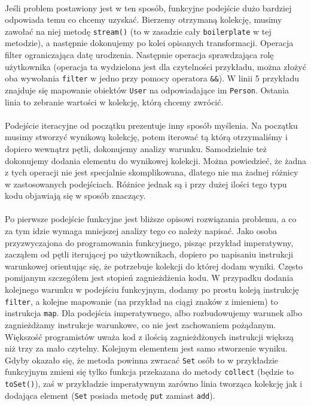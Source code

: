 \documentclass[a4paper,10pt]{report}
\begin{document}
\paragraph{}
Jeśli problem postawiony jest w ten sposób, funkcyjne podejście dużo bardziej odpowiada temu co chcemy uzyskać. Bierzemy otrzymaną kolekcję, musimy zawołać na niej metodę \verb|stream()| (to w zasadzie cały \verb|boilerplate| w tej metodzie), a następnie
dokonujemy po kolei opisanych transformacji. Operacja filter ograniczająca datę urodzenia. Następnie operacja sprawdzająca rolę użytkownika (operacja ta wydzielona jest dla czytelności przykładu, można złożyć oba wywołania \verb|filter| w jedno przy pomocy operatora
\verb|&&|). W linii 5 przykładu znajduje się mapowanie obiektów \verb|User| na odpowiadające im \verb|Person|. Ostania linia to zebranie wartości w kolekcję, którą chcemy zwrócić.
\paragraph{}
Podejście iteracyjne od początku prezentuje inny sposób myślenia. Na początku musimy stworzyć wynikową kolekcję, potem iterować tą którą otrzymaliśmy i dopiero wewnątrz pętli, dokonujemy analizy warunku. Samodzielnie też dokonujemy dodania elementu do wynikowej kolekcji. Można powiedzieć, że żadna z tych operacji nie jest specjalnie skomplikowana, dlatego nie ma żadnej różnicy w zastosowanych podejściach. Różnice jednak są i przy dużej ilości tego typu kodu objawiają się w sposób znaczący.
\paragraph{}
Po pierwsze podejście funkcyjne jest bliższe opisowi rozwiązania problemu, a co za tym idzie wymaga mniejszej analizy tego co należy napisać. Jako osoba przyzwyczajona do programowania funkcyjnego, pisząc przykład imperatywny, zacząłem od pętli iterującej po użytkownikach, dopiero po napisaniu instrukcji warunkowej orientując się, że potrzebuje kolekcji do której dodam wyniki. Często pomijanym szczegółem jest stopień zagnieżdżenia kodu. W przypadku dodania kolejnego warunku w podejściu funkcyjnym, dodamy po prostu koleją instrukcję \verb|filter|, a kolejne mapowanie (na przykład na ciągi znaków z imieniem) to instrukcja \verb|map|. Dla podejścia imperatywnego, albo rozbudowujemy warunek albo zagnieżdżamy instrukcje warunkowe, co nie jest zachowaniem pożądanym. Większość programistów uważa kod z ilością zagnieżdżonych instrukcji większą niż trzy za mało czytelny. Kolejnym elementem jest samo stworzenie wyniku. Gdyby okazało się, że metoda powinna zwracać \verb|Set| osób to w przykładzie funkcyjnym zmieni się tylko funkcja przekazana do metody \verb|collect| (będzie to \verb|toSet()|), zaś w przykładzie imperatywnym zarówno linia tworząca kolekcję jak i dodająca element (\verb|Set| posiada metodę \verb|put| zamiast \verb|add|).
\end{document}
